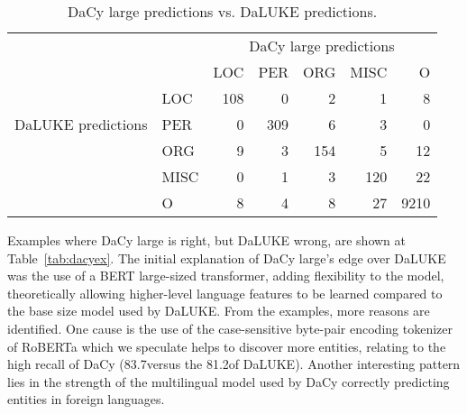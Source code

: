 \documentclass[main.tex]{subfiles}
\begin{document}
\begin{table}[H]
    \centering
    \begin{tabular}{l l | r r r r r }
        & &	\multicolumn{5}{c}{DaCy large predictions}	\\
        \multirow{5}{*}{DaLUKE predictions} & & LOC & PER & ORG & MISC & O \\\hline
           & LOC                             &  108 & 0   & 2   & 1    & 8\\
           & PER                             &  0   & 309 & 6   & 3    & 0\\
           & ORG                             &  9   & 3   & 154 & 5    & 12\\
           & MISC                            &  0   & 1   & 3   & 120  & 22\\
           & O                               &  8   & 4   & 8   & 27   & 9210
    \end{tabular}
    \label{tab:dacycompare}
    \caption{
        DaCy large predictions vs. DaLUKE predictions.
    }
\end{table}\noindent
Examples where DaCy large is right, but DaLUKE wrong, are shown at Table~\ref{tab:dacyex}.
The initial explanation of DaCy large's edge over DaLUKE was the use of a BERT large-sized transformer, adding flexibility to the model, theoretically allowing higher-level language features to be learned compared to the base size model used by DaLUKE.
From the examples, more reasons are identified.
One cause is the use of the case-sensitive byte-pair encoding tokenizer of RoBERTa \cite{conneau2020unsupervised} which we speculate helps to discover more entities, relating to the high recall of DaCy (83.7\pro versus the 81.2\pro of DaLUKE).
Another interesting pattern lies in the strength of the multilingual model used by DaCy correctly predicting entities in foreign languages.
\end{document}
